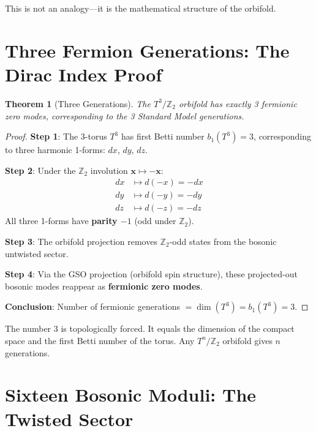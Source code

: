 \documentclass[12pt,a4paper]{article}
\newtheorem{theorem}{Theorem}[section]
\newcommand{\Ztwo}{\mathbb{Z}_2}
\newcommand{\Tthree}{T^3}
\begin{document}
This is not an analogy---it is the mathematical structure of the orbifold.

\section{Three Fermion Generations: The Dirac Index Proof}
\label{sec:dirac}

\begin{theorem}[Three Generations]
\label{thm:three_gen}
The $\Tthree/\Ztwo$ orbifold has exactly 3 fermionic zero modes, corresponding to the 3 Standard Model generations.
\end{theorem}

\begin{proof}
\textbf{Step 1}: The 3-torus $\Tthree$ has first Betti number $b_1(\Tthree) = 3$, corresponding to three harmonic 1-forms: $dx$, $dy$, $dz$.

\textbf{Step 2}: Under the $\Ztwo$ involution $\mathbf{x} \mapsto -\mathbf{x}$:
\begin{align}
dx &\mapsto d(-x) = -dx \\
dy &\mapsto d(-y) = -dy \\
dz &\mapsto d(-z) = -dz
\end{align}
All three 1-forms have \textbf{parity $-1$} (odd under $\Ztwo$).

\textbf{Step 3}: The orbifold projection removes $\Ztwo$-odd states from the bosonic untwisted sector.

\textbf{Step 4}: Via the GSO projection (orbifold spin structure), these projected-out bosonic modes reappear as \textbf{fermionic zero modes}.

\textbf{Conclusion}: Number of fermionic generations $= \dim(\Tthree) = b_1(\Tthree) = 3$.
\end{proof}

\begin{keyresult}
The number 3 is topologically forced. It equals the dimension of the compact space and the first Betti number of the torus. Any $T^n/\Ztwo$ orbifold gives $n$ generations.
\end{keyresult}

\section{Sixteen Bosonic Moduli: The Twisted Sector}
\label{sec:moduli}
\end{document}
